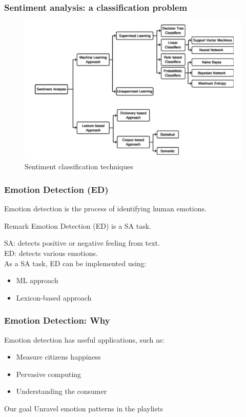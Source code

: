 \documentclass[xcolor=dvipsnames]{beamer}
\begin{document}
\begin{frame}
\frametitle{Sentiment analysis: a classification problem}
\begin{figure}
	\centering
	\includegraphics[scale=0.4]{./images/sentiment_classification}
	\caption{Sentiment classification techniques}
\end{figure}
\end{frame}

\begin{frame}
\frametitle{Emotion Detection (ED)}
\begin{definition}
Emotion detection is the process of identifying human emotions.
\end{definition}
\begin{block}{Remark}
Emotion Detection (ED) is a SA task.
\end{block}
SA: detects positive or negative feeling from text.\\
ED: detects various emotions.\\
As a SA task, ED can be implemented using:
\begin{itemize}
\item ML approach
\item Lexicon-based approach
\end{itemize}
\end{frame}

\begin{frame}
\frametitle{Emotion Detection: Why}
Emotion detection has useful applications, such as: 
\begin{itemize}
\item Measure citizens happiness
\item Pervasive computing
\item Understanding the consumer
\end{itemize}
\begin{block}{Our goal}
Unravel emotion patterns in the playlists
\end{block}
\end{frame}
\end{document}
